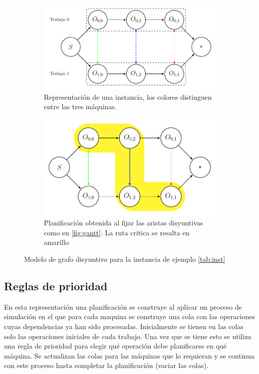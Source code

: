 \begin{figure}
    \centering
    \begin{subfigure}{.8\textwidth}
        \centering
        \includegraphics[width=.8\linewidth]{Imagenes/disyuntive.pdf}
        \caption{Representación de una instancia, los colores distinguen entre las tres máquinas.}
    \end{subfigure}
    \begin{subfigure}{.8\textwidth}
        \centering
        \includegraphics[width=.8\linewidth]{Imagenes/plandisyuntive.pdf}
        \caption{Planificación obtenida al fijar las aristas disyuntivas como en \ref{fig:gantt}. La ruta critica se resalta en amarillo}
    \end{subfigure}
\caption{Modelo de grafo disyuntivo para la instancia de ejemplo \ref{tab:inst}}
\end{figure}

\subsection*{Reglas de prioridad}
En esta representación una planificación se construye al aplicar un proceso de simulación en el que para cada maquina se construye una cola con las operaciones cuyas dependencias ya han sido procesadas. Inicialmente se tienen en las colas solo las operaciones iniciales de cada trabajo. Una vez que se tiene esto se utiliza una regla de prioridad para elegir qué operación debe planificarse en qué máquina. Se actualizan las colas para las máquinas que lo requieran y se continua con este proceso hasta completar la planificación (vaciar las colas).

